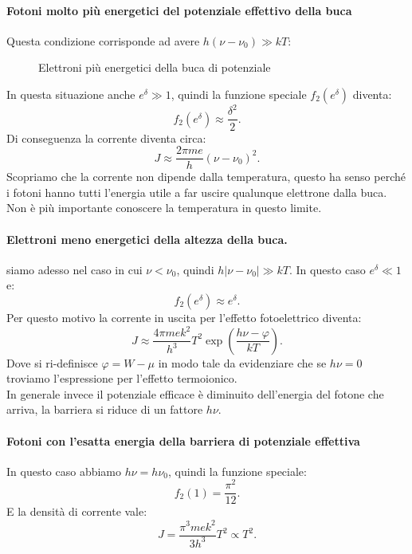 \paragraph{Fotoni molto più energetici del potenziale effettivo della buca}
Questa condizione corrisponde ad avere $h\left( \nu -\nu_0 \right) \gg kT$:
\begin{figure}[H]
    \centering
    \caption{\scriptsize Elettroni più energetici della buca di potenziale}
    \label{fig:elettroni-pi-energetici-della-buca-di-potenziale}
\end{figure}
\noindent
In questa situazione anche $e^{\delta }\gg 1$, quindi la funzione speciale $f_2( e^{\delta }) $ diventa:
\[
	f_2( e^{\delta }) \approx \frac{\delta ^2}{2}
.\] 
Di conseguenza la corrente diventa circa:
\[
	J \approx \frac{2\pi m e}{h} \left( \nu -\nu_0 \right)^2
.\] 
Scopriamo che la corrente non dipende dalla temperatura, questo ha senso perché i fotoni hanno tutti l'energia utile a far uscire qualunque elettrone dalla buca. Non è più importante conoscere la temperatura in questo limite.\\
\paragraph{Elettroni meno energetici della altezza della buca.}
siamo adesso nel caso in cui $\nu < \nu_0$, quindi $h\left| \nu -\nu_0 \right| \gg kT$. In questo caso $e^{\delta }\ll 1$ e:
\[
	f_2( e^{\delta }) \approx e^{\delta }
.\] 
Per questo motivo la corrente in uscita per l'effetto fotoelettrico diventa:
\[
	J \approx \frac{4\pi m e k^2}{h^3}T^2 \exp\left(  \frac{h\nu - \varphi}{kT}\right) 
.\] 
Dove si ri-definisce $\varphi = W - \mu $ in modo tale da evidenziare che se $h\nu = 0$ troviamo l'espressione per l'effetto termoionico.\\
In generale invece il potenziale efficace è diminuito dell'energia del fotone che arriva, la barriera si riduce di un fattore $h\nu $.
\paragraph{Fotoni con l'esatta energia della barriera di potenziale effettiva}
In questo caso abbiamo $h\nu = h\nu_0$, quindi la funzione speciale:
\[
	f_2( 1) = \frac{\pi^2}{12}
.\] 
E la densità di corrente vale:
\[
	J = \frac{\pi^3 m e k^2}{3h^3}T^2 \propto T^2
.\] 
